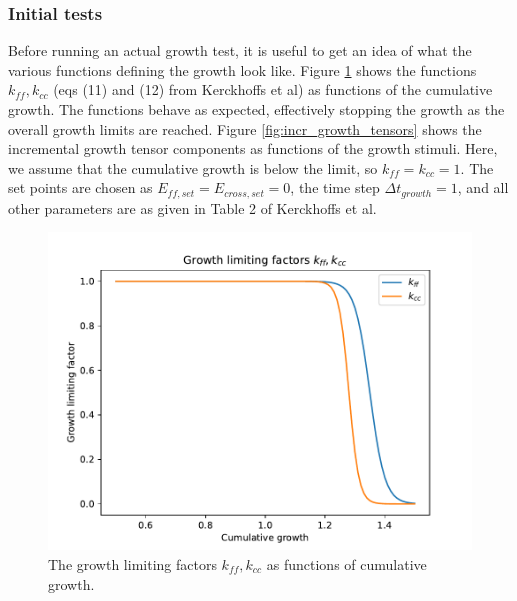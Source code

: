 \documentclass[a4paper,10pt]{article}
\begin{document}
\subsubsection{Initial tests}
Before running an actual growth test, it is useful to get an idea of what the various functions defining the
growth look like. Figure \ref{fig:k_functions} shows the functions $k_{ff}, k_{cc}$ (eqs (11) and (12) from Kerckhoffs et al)
as functions of the cumulative growth. The functions behave as expected, effectively stopping the growth as 
the overall growth limits are reached. Figure \ref{fig:incr_growth_tensors} shows the incremental growth tensor components
as functions of the growth stimuli. Here, we assume that the cumulative growth is below the limit, so $k_{ff} = k_{cc} = 1$.
The set points are chosen as $E_{ff, set} = E_{cross,set} = 0$, the time step $\Delta t_{growth} = 1$, 
and all other parameters are as given in Table 2 of Kerckhoffs et al.  
\begin{figure}
  \centerline{
    \includegraphics{figs/k_functions}
  }
\caption{The growth limiting factors $k_{ff}, k_{cc}$ as functions of cumulative growth.}
\label{fig:k_functions}
\end{figure}
\end{document}
